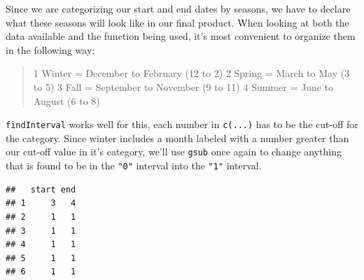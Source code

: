 \documentclass[
  11,
]{book}
\newenvironment{Shaded}{\begin{snugshade}}{\end{snugshade}}
\newcommand{\CommentTok}[1]{\textcolor[rgb]{0.37,0.37,0.37}{\textit{#1}}}
\newcommand{\DecValTok}[1]{\textcolor[rgb]{0.06,0.06,0.06}{#1}}
\newcommand{\FunctionTok}[1]{\textcolor[rgb]{0.27,0.27,0.27}{\textbf{#1}}}
\newcommand{\NormalTok}[1]{#1}
\newcommand{\OtherTok}[1]{\textcolor[rgb]{0.37,0.37,0.37}{#1}}
\newcommand{\SpecialCharTok}[1]{\textcolor[rgb]{0.43,0.43,0.43}{\textbf{#1}}}
\newcommand{\StringTok}[1]{\textcolor[rgb]{0.5,0.5,0.5}{#1}}
\begin{document}
Since we are categorizing our start and end dates by seasons, we have to declare what these seasons will look like in our final product. When looking at both the data available and the function being used, it's most convenient to organize them in the following way:

\begin{quote}
1 Winter = December to February (12 to 2) 2 Spring = March to May (3 to 5) 3 Fall = September to November (9 to 11) 4 Summer = June to August (6 to 8)
\end{quote}

\texttt{findInterval} works well for this, each number in \texttt{c(...)} has to be the cut-off for the category. Since winter includes a month labeled with a number greater than our cut-off value in it's category, we'll use \texttt{gsub} once again to change anything that is found to be in the \texttt{"0"} interval into the \texttt{"1"} interval.

\begin{Shaded}
\end{Shaded}

\begin{verbatim}
##   start end
## 1     3   4
## 2     1   1
## 3     1   1
## 4     1   1
## 5     1   1
## 6     1   1
\end{verbatim}
\end{document}
